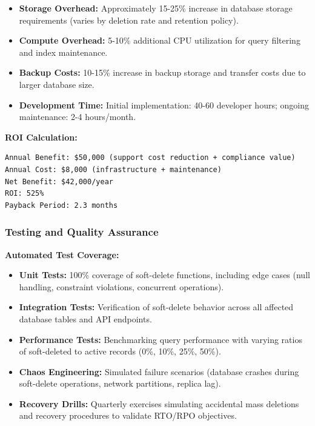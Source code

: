 \documentclass[12pt,a4paper]{article}
\begin{document}
\begin{tcolorbox}[colback=primaryblue!5, colframe=primaryblue, boxrule=1pt, arc=3pt, left=10pt, right=10pt, top=8pt, bottom=8pt]
\begin{itemize}[leftmargin=2em, itemsep=6pt]
    \item \textbf{Storage Overhead:} Approximately 15-25\% increase in database storage requirements (varies by deletion rate and retention policy).
    \item \textbf{Compute Overhead:} 5-10\% additional CPU utilization for query filtering and index maintenance.
    \item \textbf{Backup Costs:} 10-15\% increase in backup storage and transfer costs due to larger database size.
    \item \textbf{Development Time:} Initial implementation: 40-60 developer hours; ongoing maintenance: 2-4 hours/month.
\end{itemize}

\vspace{0.5em}

\textbf{ROI Calculation:}

\begin{verbatim}
Annual Benefit: $50,000 (support cost reduction + compliance value)
Annual Cost: $8,000 (infrastructure + maintenance)
Net Benefit: $42,000/year
ROI: 525%
Payback Period: 2.3 months
\end{verbatim}

\subsubsection{Testing and Quality Assurance}

\textbf{Automated Test Coverage:}

\begin{itemize}[leftmargin=2em, itemsep=6pt]
    \item \textbf{Unit Tests:} 100\% coverage of soft-delete functions, including edge cases (null handling, constraint violations, concurrent operations).
    \item \textbf{Integration Tests:} Verification of soft-delete behavior across all affected database tables and API endpoints.
    \item \textbf{Performance Tests:} Benchmarking query performance with varying ratios of soft-deleted to active records (0\%, 10\%, 25\%, 50\%).
    \item \textbf{Chaos Engineering:} Simulated failure scenarios (database crashes during soft-delete operations, network partitions, replica lag).
    \item \textbf{Recovery Drills:} Quarterly exercises simulating accidental mass deletions and recovery procedures to validate RTO/RPO objectives.
\end{itemize}


\end{tcolorbox}
\end{document}
